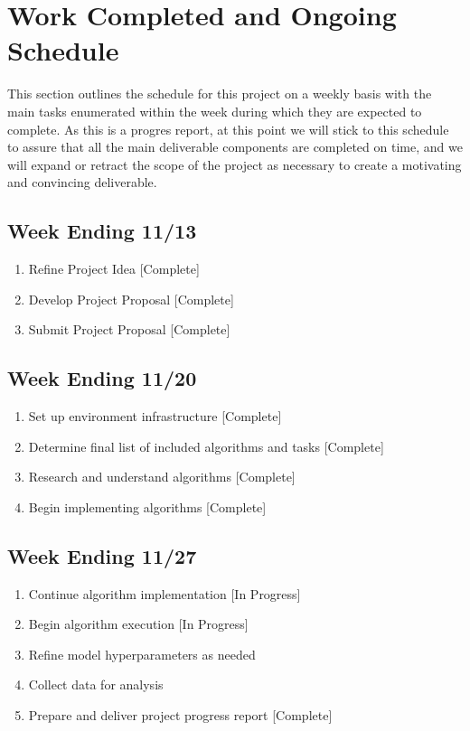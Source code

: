 \documentclass[conference]{IEEEtran}
\begin{document}
\section{Work Completed and Ongoing Schedule} \label{deliverables}
This section outlines the schedule for this project on a weekly basis with the main tasks enumerated within the week during which they are expected to complete.
As this is a progres report, at this point we will stick to this schedule to assure that all the main deliverable components are completed on time, and we will expand or retract the scope of the project as necessary to create a motivating and convincing deliverable.

\subsection{Week Ending 11/13}
\begin{enumerate}
    \item Refine Project Idea [Complete]
    \item Develop Project Proposal [Complete]
    \item Submit Project Proposal [Complete]
\end{enumerate}

\subsection{Week Ending 11/20}
\begin{enumerate}
    \item Set up environment infrastructure [Complete]
    \item Determine final list of included algorithms and tasks [Complete]
    \item Research and understand algorithms [Complete]
    \item Begin implementing algorithms [Complete]
\end{enumerate}

\subsection{Week Ending 11/27}
\begin{enumerate}
    \item Continue algorithm implementation [In Progress]
    \item Begin algorithm execution [In Progress]
    \item Refine model hyperparameters as needed
    \item Collect data for analysis
    \item Prepare and deliver project progress report [Complete]
\end{enumerate}
\end{document}
